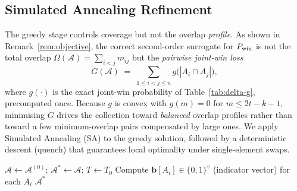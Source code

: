 \subsection{Simulated Annealing Refinement}
\label{sec:algo-sa}

The greedy stage controls coverage but not the overlap \emph{profile}.  As
shown in Remark~\ref{rem:objective}, the correct second-order surrogate
for $P_{\mathrm{win}}$ is not the total overlap $\Omega(\mathcal{A}) = \sum_{i<j}
m_{ij}$ but the \emph{pairwise joint-win loss}
\[
  G(\mathcal{A}) \;=\; \sum_{1 \le i < j \le n} g\bigl(|A_i \cap A_j|\bigr),
\]
where $g(\cdot)$ is the exact joint-win probability of
Table~\ref{tab:delta-g}, precomputed once.  Because $g$ is convex with
$g(m) = 0$ for $m \le 2t-k-1$, minimising $G$ drives the collection toward
\emph{balanced} overlap profiles rather than toward a few minimum-overlap
pairs compensated by large ones.  We apply Simulated Annealing (SA)
\cite{Kirkpatrick1983} to the greedy solution, followed by a deterministic
descent (quench) that guarantees local optimality under single-element
swaps.

\begin{algorithm}[H]
  \caption{Simulated Annealing for Balanced-Overlap Refinement}
  \label{alg:sa}
  \BlankLine
  $\mathcal{A} \leftarrow \mathcal{A}^{(0)}$;
  $\mathcal{A}^* \leftarrow \mathcal{A}$;
  $T \leftarrow T_0$\;
  Compute $\bm{b}[A_i] \in \{0,1\}^v$ (indicator vector) for each $A_i$\;
  \BlankLine
  \BlankLine
  \Return $\mathcal{A}^*$\;
\end{algorithm}

